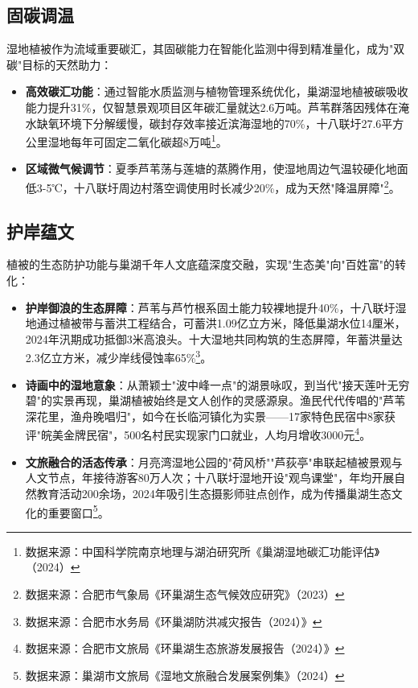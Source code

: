 \subsection{固碳调温}
湿地植被作为流域重要碳汇，其固碳能力在智能化监测中得到精准量化，成为"双碳"目标的天然助力：
\begin{itemize}[label={$\bullet$}, leftmargin=2em]
    \item \textbf{高效碳汇功能}：通过智能水质监测与植物管理系统优化，巢湖湿地植被碳吸收能力提升31\%，仅智慧景观项目区年碳汇量就达2.6万吨。芦苇群落因残体在淹水缺氧环境下分解缓慢，碳封存效率接近滨海湿地的70\%，十八联圩27.6平方公里湿地每年可固定二氧化碳超8万吨\footnote{数据来源：中国科学院南京地理与湖泊研究所《巢湖湿地碳汇功能评估》（2024）}。
    \item \textbf{区域微气候调节}：夏季芦苇荡与莲塘的蒸腾作用，使湿地周边气温较硬化地面低3-5℃，十八联圩周边村落空调使用时长减少20\%，成为天然"降温屏障"\footnote{数据来源：合肥市气象局《环巢湖生态气候效应研究》（2023）}。
\end{itemize}

\subsection{护岸蕴文}
植被的生态防护功能与巢湖千年人文底蕴深度交融，实现"生态美"向"百姓富"的转化：
\begin{itemize}
    \item \textbf{护岸御浪的生态屏障}：芦苇与芦竹根系固土能力较裸地提升40\%，十八联圩湿地通过植被带与蓄洪工程结合，可蓄洪1.09亿立方米，降低巢湖水位14厘米，2024年汛期成功抵御3米高浪头。十大湿地共同构筑的生态屏障，年蓄洪量达2.3亿立方米，减少岸线侵蚀率65\%\footnote{数据来源：合肥市水务局《环巢湖防洪减灾报告（2024）》}。
    \item \textbf{诗画中的湿地意象}：从萧颖士"波中峰一点"的湖景咏叹，到当代"接天莲叶无穷碧"的实景再现，巢湖植被始终是文人创作的灵感源泉。渔民代代传唱的"芦苇深花里，渔舟晚唱归"，如今在长临河镇化为实景——17家特色民宿中8家获评"皖美金牌民宿"，500名村民实现家门口就业，人均月增收3000元\footnote{数据来源：合肥市文旅局《环巢湖生态旅游发展报告（2024）》}。
    \item \textbf{文旅融合的活态传承}：月亮湾湿地公园的"荷风桥""芦荻亭"串联起植被景观与人文节点，年接待游客80万人次；十八联圩湿地开设"观鸟课堂"，年均开展自然教育活动200余场，2024年吸引生态摄影师驻点创作，成为传播巢湖生态文化的重要窗口\footnote{数据来源：巢湖市文旅局《湿地文旅融合发展案例集》（2024）}。
\end{itemize}
